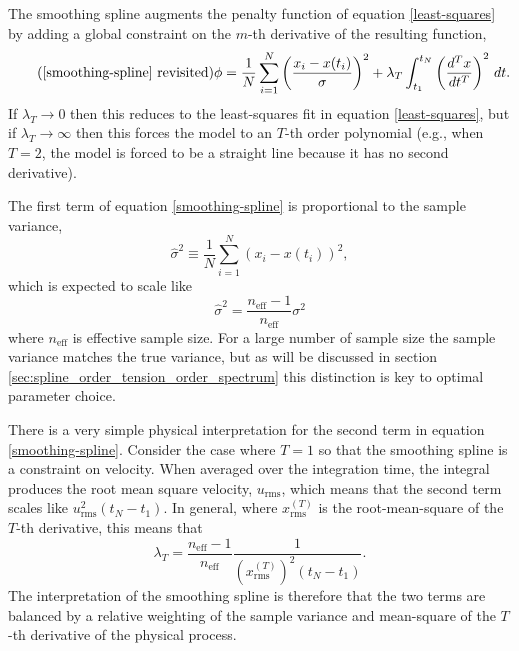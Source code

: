 \documentclass[10pt,journal]{IEEEtran}
\begin{document}
The smoothing spline augments the penalty function of equation \ref{least-squares} by adding a global constraint on the $m$-th derivative of the resulting function,
\begin{equation*}
\tag{\ref{smoothing-spline} revisited}
\phi =  \frac{1}{N}\sum_{i=1}^{N} \left( \frac{x_i - x(t_i)}{\sigma} \right) ^2 + \lambda_T \int_{t_1}^{t_N} \left(\frac{d^T x}{dt^T}\right)^2 \, dt.
\end{equation*}
If $\lambda_T \rightarrow 0$ then this reduces to the least-squares fit in equation \ref{least-squares}, but if $\lambda_T \rightarrow \infty$ then this forces the model to an $T$-th order polynomial (e.g., when $T=2$, the model is forced to be a straight line because it has no second derivative).

The first term of equation \ref{smoothing-spline} is proportional to the sample variance,
\begin{equation}
\label{sample_variance}
\hat{\sigma}^2  \equiv \frac{1}{N} \sum_{i=1}^{N} \left( x_i - x(t_i) \right) ^2,
\end{equation}
which is expected to scale like
\begin{equation}
\label{sample_variance_variance}
\hat{\sigma}^2 = \frac{n_{\textrm{eff}}-1}{n_{\textrm{eff}}} \sigma^2
\end{equation}
where $n_{\textrm{eff}}$ is effective sample size. For a large number of sample size the sample variance matches the true variance, but as will be discussed in section \ref{sec:spline_order_tension_order_spectrum} this distinction is key to optimal parameter choice.

There is a very simple physical interpretation for the second term in equation \ref{smoothing-spline}. Consider the case where $T=1$ so that the smoothing spline is a constraint on velocity. When averaged over the integration time, the integral produces the root mean square velocity, $u_{\textrm{rms}}$, which means that the second term scales like $u_{\textrm{rms}}^2 (t_N-t_1)$. In general, where $x^{(T)}_{\textrm{rms}}$ is the root-mean-square of the $T$-th derivative, this means that
\begin{equation}
\label{lambda}
\lambda_T = \frac{n_{\textrm{eff}}-1}{n_{\textrm{eff}}} \frac{1}{ \left(x^{(T)}_{\textrm{rms}}\right)^2 (t_N-t_1)}.
\end{equation}
The interpretation of the smoothing spline is therefore that the two terms are balanced by a relative weighting of the sample variance and mean-square of the $T$-th derivative of the physical process.
\end{document}
